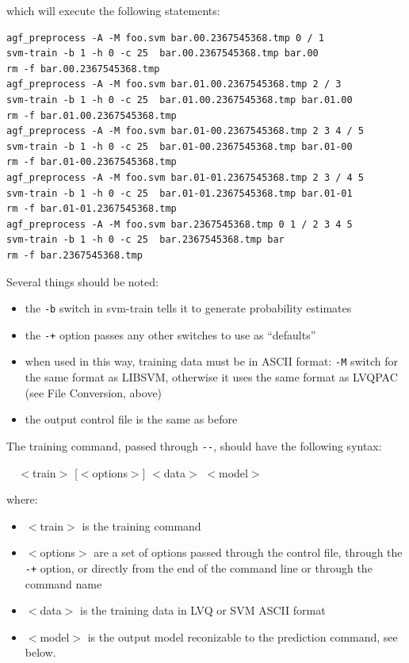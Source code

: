 \documentclass[12pt]{article}
\begin{document}
which will execute the following statements:

\begin{verbatim}
agf_preprocess -A -M foo.svm bar.00.2367545368.tmp 0 / 1
svm-train -b 1 -h 0 -c 25  bar.00.2367545368.tmp bar.00
rm -f bar.00.2367545368.tmp
agf_preprocess -A -M foo.svm bar.01.00.2367545368.tmp 2 / 3
svm-train -b 1 -h 0 -c 25  bar.01.00.2367545368.tmp bar.01.00
rm -f bar.01.00.2367545368.tmp
agf_preprocess -A -M foo.svm bar.01-00.2367545368.tmp 2 3 4 / 5
svm-train -b 1 -h 0 -c 25  bar.01-00.2367545368.tmp bar.01-00
rm -f bar.01-00.2367545368.tmp
agf_preprocess -A -M foo.svm bar.01-01.2367545368.tmp 2 3 / 4 5
svm-train -b 1 -h 0 -c 25  bar.01-01.2367545368.tmp bar.01-01
rm -f bar.01-01.2367545368.tmp
agf_preprocess -A -M foo.svm bar.2367545368.tmp 0 1 / 2 3 4 5
svm-train -b 1 -h 0 -c 25  bar.2367545368.tmp bar
rm -f bar.2367545368.tmp
\end{verbatim}

Several things should be noted:
\begin{itemize}
\item the \verb/-b/ switch in svm-train tells it to generate probability estimates
\item the \verb/-+/ option passes any other switches to use as ``defaults''
\item when used in this way, training data must be in ASCII format: \verb/-M/ switch for the same format as LIBSVM, otherwise it uses the same format as LVQPAC (see File Conversion, above)
\item the output control file is the same as before
\end{itemize}

The training command, passed through \verb/--/, should have the following syntax:

\verb/  /$<$train$>$ [$<$options$>$] $<$data$>$ $<$model$>$

where:
\begin{itemize}
\item $<$train$>$ is the training command
\item $<$options$>$ are a set of options passed through the control file, through the \verb/-+/ option, or directly from the end of the command line or through the command name
\item $<$data$>$ is the training data in LVQ or SVM ASCII format
\item $<$model$>$ is the output model reconizable to the prediction command, see below.
\end{itemize}
\end{document}
